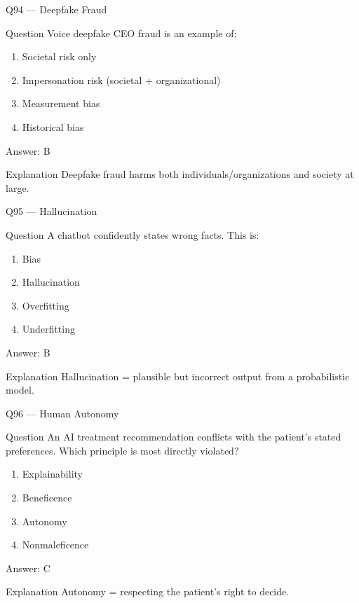 \documentclass[aspectratio=169,8pt]{beamer}
\begin{document}
	\begin{frame}{Q94 --- Deepfake Fraud}
		\begin{block}{Question}
			Voice deepfake CEO fraud is an example of:
		\end{block}
		\begin{enumerate}
			\item Societal risk only
			\item Impersonation risk (societal + organizational)
			\item Measurement bias
			\item Historical bias
		\end{enumerate}
		\begin{exampleblock}{Answer: B}\end{exampleblock}
		\begin{block}{Explanation}
			Deepfake fraud harms both individuals/organizations and society at large.
		\end{block}
	\end{frame}
	
	\begin{frame}{Q95 --- Hallucination}
		\begin{block}{Question}
			A chatbot confidently states wrong facts. This is:
		\end{block}
		\begin{enumerate}
			\item Bias
			\item Hallucination
			\item Overfitting
			\item Underfitting
		\end{enumerate}
		\begin{exampleblock}{Answer: B}\end{exampleblock}
		\begin{block}{Explanation}
			Hallucination = plausible but incorrect output from a probabilistic model.
		\end{block}
	\end{frame}
	
	\begin{frame}{Q96 --- Human Autonomy}
		\begin{block}{Question}
			An AI treatment recommendation conflicts with the patient's stated preferences. Which principle is most directly violated?
		\end{block}
		\begin{enumerate}
			\item Explainability
			\item Beneficence
			\item Autonomy
			\item Nonmaleficence
		\end{enumerate}
		\begin{exampleblock}{Answer: C}\end{exampleblock}
		\begin{block}{Explanation}
			Autonomy = respecting the patient's right to decide.
		\end{block}
	\end{frame}
	
\end{document}
